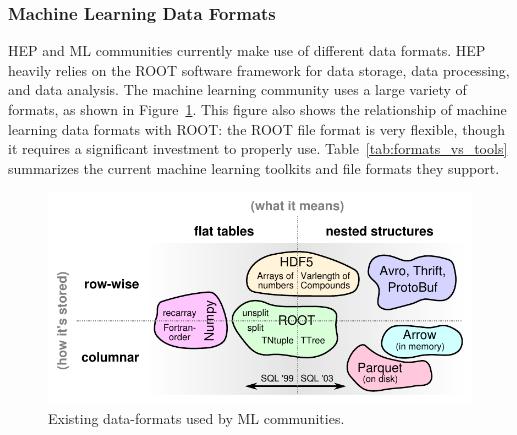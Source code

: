 \subsubsection{Machine Learning Data Formats}\label{sec:data_formats}

HEP and ML communities currently make use of different data formats. HEP heavily relies on the ROOT software framework for data storage, data processing, and data analysis. The machine learning community uses a large variety of formats, as shown in Figure~\ref{fig:data-formats}. This figure also shows the relationship of machine learning data formats with ROOT: the ROOT file format is very flexible, though it requires a significant investment to properly use. Table~\ref{tab:formats_vs_tools} summarizes the current machine learning toolkits and file formats they support.
\begin{figure}[htbp]
 \centering
 \includegraphics[width=0.7\linewidth]{images/table-of-formats.pdf}
 \caption{Existing data-formats used by ML communities.}\label{fig:data-formats}
\end{figure}
\vspace{-5pt}
